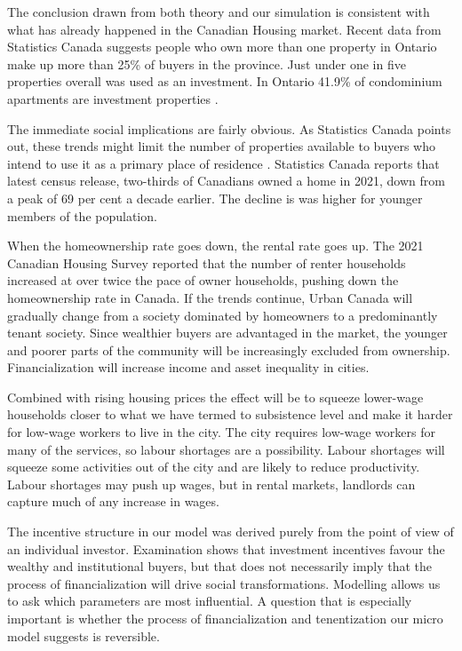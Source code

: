 The conclusion drawn from both theory and our simulation is consistent with what has already happened in the Canadian Housing market. Recent data from Statistics Canada \cite{fontaineResidentialRealEstate2023} suggests people who own more than one property in Ontario make up more than 25\% of buyers in the province. %
Just under one in five properties overall was used as an investment.
In Ontario 41.9\% of condominium apartments are investment properties \cite{statisticscanadaBuyRentHousing2022}.

The immediate social implications are fairly obvious. As Statistics Canada points out, these trends might limit the number of properties available to buyers who intend to use it as a primary place of residence  \cite{fontaineResidentialRealEstate2023}. Statistics Canada reports that latest census release, two-thirds of Canadians owned a home in 2021, down from a peak of 69 per cent a decade earlier. The decline is was higher for younger members of the population. 

When the homeownership rate goes down, the rental rate goes up. The 2021 Canadian Housing Survey reported that the number of renter households increased  at over twice the pace of owner households, pushing down the homeownership rate in Canada. If the trends continue, Urban Canada will gradually change from a society dominated by homeowners to a predominantly tenant society. Since wealthier buyers are advantaged in the market, the younger and poorer parts of the community will be increasingly excluded from ownership. Financialization will increase income and asset inequality in cities.

Combined with rising housing prices the effect will be to squeeze lower-wage households closer to what we have termed to subsistence level and make it harder for low-wage workers to live in the city. The city requires low-wage workers for many of the services, so labour shortages are a possibility. Labour shortages will squeeze some activities out of the city and are likely to reduce productivity. Labour shortages may push up wages, but in rental markets, landlords can capture much of any increase in wages. 

The incentive structure in our model was derived purely from the point of view of an individual investor. Examination shows that investment incentives favour the wealthy and institutional buyers, but that does not necessarily imply that the process of financialization will drive social transformations. %
Modelling  allows us to ask %
which parameters are most influential. 
A question that is especially important is whether the process of financialization and tenentization our micro model suggests is reversible.%


